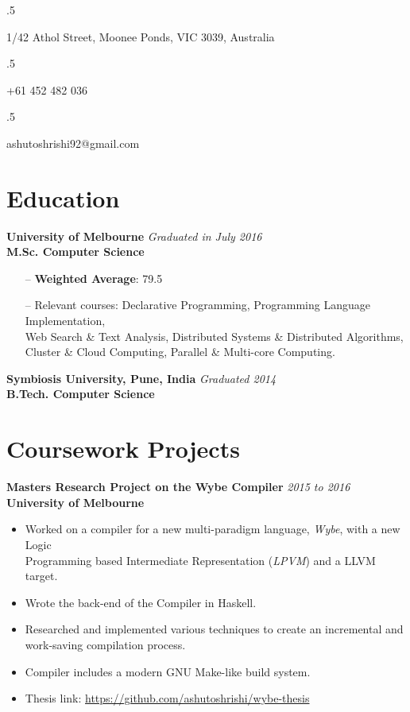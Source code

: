 \documentclass[a4paper,overlapped]{res}
\begin{document}


\begin{resume}
  \moveleft.5\hoffset\centerline{1/42 Athol Street, Moonee Ponds, VIC 3039, Australia}
  \moveleft.5\hoffset\centerline{+61 452 482 036}
  \moveleft.5\hoffset\centerline{ashutoshrishi92@gmail.com}

  \section{Education}  
  \textbf{University of Melbourne} \hfill \textit{Graduated in July 2016} \\
  \textbf{M.Sc. Computer Science }
  \begin{itemize} \itemsep -2pt
  \item[--] \textbf{Weighted Average}: 79.5
  \item[--] Relevant courses: Declarative Programming, Programming Language
    Implementation, \\ Web Search \& Text Analysis, Distributed Systems \&
    Distributed Algorithms, \\
    Cluster \& Cloud Computing, Parallel \& Multi-core Computing.
  \end{itemize}

  \textbf{Symbiosis University, Pune, India} \hfill \textit{Graduated 2014} \\
  \textbf{B.Tech. Computer Science }


  \section{Coursework Projects}
  
  \textbf{Masters Research Project on the Wybe Compiler} \hfill
  \textit{2015 to 2016}\\
  \textbf{University of Melbourne}
  \begin{itemize}
  \item Worked on a compiler for a new multi-paradigm language, \textit{Wybe},
    with a new Logic \\ Programming based Intermediate Representation
    (\textit{LPVM}) and a LLVM target.
  \item Wrote the back-end of the Compiler in Haskell.
  \item Researched and implemented various techniques to create an incremental
    and \\work-saving compilation process.
  \item Compiler includes a modern GNU Make-like build system.
  \item Thesis link: \url{https://github.com/ashutoshrishi/wybe-thesis}
  \end{itemize}


\end{resume}
\end{document}
